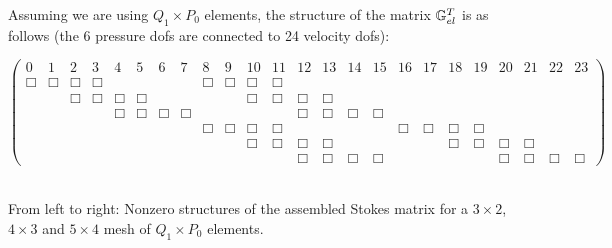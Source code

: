Assuming we are using $Q_1\times P_0$ elements, the structure of the matrix ${\mathbb{G}}_{el}^T$ is as follows
(the 6 pressure dofs are connected to 24 velocity dofs):

\begin{scriptsize}
\begin{equation}
\left(
\begin{array}{ccccccccccccccccccccccccc}
0 & 1 & 2 & 3 & 4 & 5 & 6 & 7 & 8 & 9 & 10 & 11 & 12 & 13 & 14 & 15 & 16 & 17 & 18 & 19 & 20 & 21 & 22 & 23     \\
\Box&\Box & \Box&\Box &  &  &  &  & \Box&\Box & \Box&\Box &  &  &  &  &  &  &  &  &  &  &  &  \\
    &     & \Box&\Box & \Box&\Box &  &  &  &  & \Box&\Box & \Box&\Box &  &  &  &  &  &  &  &  &  &  \\
 & &     &     & \Box&\Box & \Box&\Box &  &  &  &  & \Box&\Box & \Box&\Box &  &  &  &  &  &  &  &    \\
 & & & &  & &     &     & \Box&\Box & \Box&\Box &  &  &  &  & \Box&\Box & \Box&\Box &  &  &  &      \\
 & & & & & &  & &     &     & \Box&\Box & \Box&\Box &  &  &  &  & \Box&\Box & \Box&\Box &  &       \\
 & &  & & & & & &  & &     &     & \Box&\Box & \Box&\Box &  &  &  &  & \Box&\Box & \Box&\Box        
\end{array}
\right)
\end{equation} 
\end{scriptsize}

\begin{center}


\\
{\captionfont From left to right: Nonzero structures of the assembled Stokes matrix for a 
$3\times 2$, $4\times 3$ and $5\times 4$ mesh of $Q_1\times P_0$ elements.}
\end{center}


